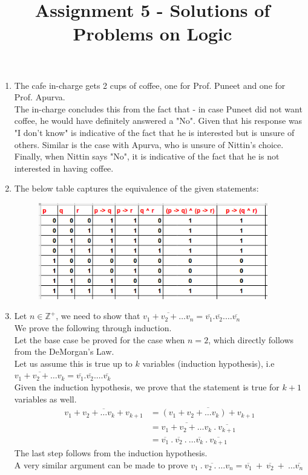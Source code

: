 \documentclass{article}
\title{Assignment 5 - Solutions of Problems on Logic}
\begin{document}
\maketitle
\begin{enumerate}

\item The cafe in-charge gets 2 cups of coffee, one for Prof. Puneet and one for Prof. Apurva. \\ 
The in-charge concludes this from the fact that - in case Puneet did not want coffee, he would have definitely answered a "No". Given that his response was "I don't know" is indicative of the fact that he is interested but is unsure of others. Similar is the case with Apurva, who is unsure of Nittin's choice. Finally, when Nittin says "No", it is indicative of the fact that he is not interested in having coffee.

\item The below table captures the equivalence of the given statements:
\begin{figure}[H]
\centering
\includegraphics[width = 10cm]{truth_table}
\end{figure}

\item Let $n \in \mathbb{Z}^+$, we need to show that $\overline{v_1 + v_2 + \dots v_n} = \overline{v_1}. \overline{v_2}. \dots \overline{v_n}$\\

We prove the following through induction. \\
Let the base case be proved for the case when $n=2$, which directly follows from the DeMorgan's Law. \\ 
Let us assume this is true up to $k$ variables (induction hypothesis), i.e  $\overline{v_1+v_2+ \dots v_k} = \overline{v_1}. \overline{v_2}. \dots \overline{v_k}$\\
Given the induction hypothesis, we prove that the statement is true for $k+1$ variables as well.\\
\begin{align*}
\overline{v_1+v_2+ \dots v_k+v_{k+1}} & = \overline{(v_1+v_2+ \dots v_k)+v_{k+1}} \\ 
& = \overline{v_1+v_2+ \dots v_k}~.~\overline{v_{k+1}}\\
&= \overline{v_1}~.~ \overline{v_2}~.~ \dots \overline{v_k}~.~ \overline{v_{k+1}}
\end{align*}
The last step follows from the induction hypothesis.\\
A very similar argument can be made to prove $\overline{v_1~.~ v_2 ~.~ \dots v_n} = \overline{v_1}~+~ \overline{v_2}~+~ \dots \overline{v_n}$


\end{enumerate}
\end{document}
